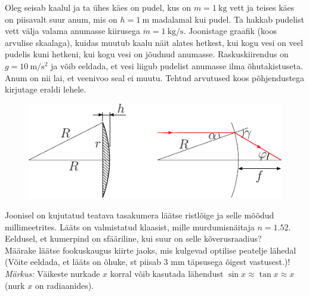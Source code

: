 \documentclass[10pt]{article}
\begin{document}

Oleg seisab kaalul ja ta ühes käes on pudel, kus on $m=\SI{1}{\kilogram}$ vett ja teises käes on piisavalt suur anum, mis on $h=\SI{1}{\meter}$ madalamal kui pudel. Ta hakkab pudelist vett välja valama anumasse kiirusega $\dot{m}=\SI{1}{\kilo\gram / \second}$.
Joonistage graafik (koos arvulise skaalaga), kuidas muutub kaalu näit alates hetkest, kui kogu vesi on veel pudelis kuni hetkeni, kui kogu vesi on jõudnud anumasse. Raskuskiirendus on $g=\SI{10}{\meter / \second\squared}$ ja võib eeldada, et vesi liigub pudelist anumasse ilma õhutakistuseta. Anum on nii lai, et veenivoo seal ei muutu. Tehtud arvutused koos põhjendustega kirjutage eraldi lehele.
\probend
\bigskip


\begin{figure}
    \vspace{-30pt}
    \begin{center}
        \includegraphics[width=\linewidth]{2023-lahg-08-yl.pdf}
    \end{center}
\end{figure}
Joonisel on kujutatud teatava tasakumera läätse ristlõige ja selle mõõdud millimeetrites. Lääts on valmistatud klaasist, mille murdumisnäitaja $n=\num{1.52}$.\\
\osa Eeldusel, et kumerpind on sfääriline, kui suur on selle kõverusraadius?\\
\osa Määrake läätse fookuskaugus kiirte jaoks, mis kulgevad optilise peatelje lähedal (Võite eeldada, et lääts on õhuke, st piisab 3 mm täpsusega õigest vastusest.)! \\ \emph{Märkus:} Väikeste nurkade $x$ korral võib kasutada lähendust $\sin{x} \approx \tan{x} \approx x$ (nurk $x$ on radiaanides).
\probend
\bigskip
\end{document}
